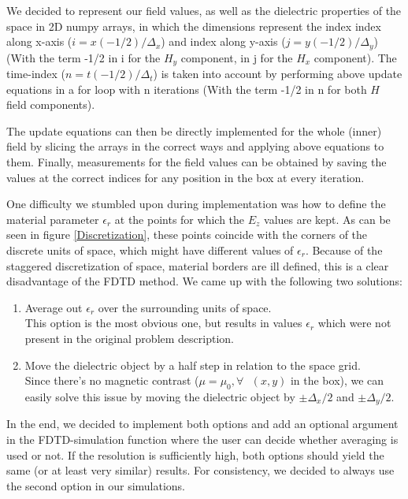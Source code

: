 \documentclass[11pt, a4paper]{article}
\begin{document}
We decided to represent our field values, as well as the dielectric properties of the space in 2D numpy arrays, in which the dimensions represent the index index along x-axis ($i = x(-1/2)/\Delta_x$) and index along y-axis ($j = y(-1/2)/\Delta_y$) (With the term -1/2 in i for the $H_y$ component, in j for the $H_x$ component). The time-index ($n = t(-1/2)/\Delta_t$) is taken into account by performing above update equations in a for loop with n iterations (With the term -1/2 in n for both $H$ field components). 

The update equations can then be directly implemented for the whole (inner) field by slicing the arrays in the correct ways and applying above equations to them. Finally, measurements for the field values can be obtained by saving the values at the correct indices for any position in the box at every iteration.

One difficulty we stumbled upon during implementation was how to define the material parameter $\epsilon_r$ at the points for which the $E_z$ values are kept. As can be seen in figure \ref{Discretization}, these points coincide with the corners of the discrete units of space, which might have different values of $\epsilon_r$. Because of the staggered discretization of space, material borders are ill defined, this is a clear disadvantage of the FDTD method. We came up with the following two solutions:
\label{eps_averaging_subsection}
\begin{enumerate}
    \item \label{eps_averaging} Average out $\epsilon_r$ over the surrounding units of space. \\
    This option is the most obvious one, but results in values $\epsilon_r$ which were not present in the original problem description.
    \item Move the dielectric object by a half step in relation to the space grid. \\
    Since there's no magnetic contrast ($\mu = \mu_0, \forall \text{ } (x,y) $ in the box), we can easily solve this issue by moving the dielectric object by $\pm \Delta_x/2$ and $\pm \Delta_y/2$.
\end{enumerate}

In the end, we decided to implement both options and add an optional argument in the FDTD-simulation function where the user can decide whether averaging is used or not. If the resolution is sufficiently high, both options should yield the same (or at least very similar) results. For consistency, we decided to always use the second option in our simulations.
\end{document}
